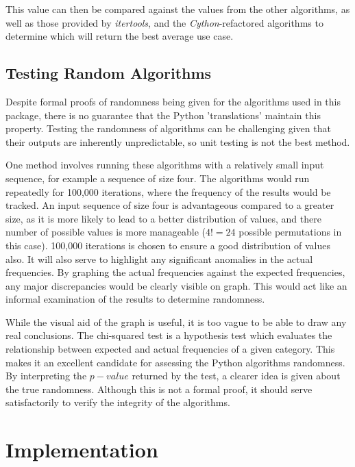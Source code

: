\documentclass[12pt]{article}
\begin{document}
This value can then be compared against the values from the other algorithms, as well as those provided by \textit{itertools}, and the \textit{Cython}-refactored algorithms to determine which will return the best average use case.

\subsection{Testing Random Algorithms}

Despite formal proofs of randomness being given for the algorithms used in this package, there is no guarantee that the Python 'translations' maintain this property. Testing the randomness of algorithms can be challenging given that their outputs are inherently unpredictable, so unit testing is not the best method.

One method involves running these algorithms with a relatively small input sequence, for example a sequence of size four. The algorithms would run repeatedly for 100,000 iterations, where the frequency of the results would be tracked. An input sequence of size four is advantageous compared to a greater size, as it is more likely to lead to a better distribution of values, and there number of possible values is more manageable (\(4!=24\) possible permutations in this case). 100,000 iterations is chosen to ensure a good distribution of values also. It will also serve to highlight any significant anomalies in the actual frequencies. By graphing the actual frequencies against the expected frequencies, any major discrepancies would be clearly visible on graph. This would act like an informal examination of the results to determine randomness.

While the visual aid of the graph is useful, it is too vague to be able to draw any real conclusions. The chi-squared test is a hypothesis test which evaluates the relationship between expected and actual frequencies of a given category. This makes it an excellent candidate for assessing the Python algorithms randomness. By interpreting the \(p-value\) returned by the test, a clearer idea is given about the true randomness. Although this is not a formal proof, it should serve satisfactorily to verify the integrity of the algorithms.

\pagebreak

\section{Implementation}
\end{document}
